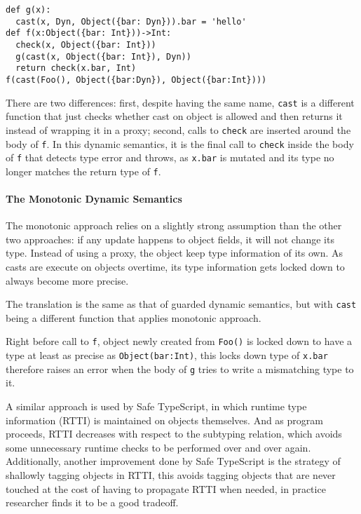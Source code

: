\begin{verbatim}
def g(x):
  cast(x, Dyn, Object({bar: Dyn})).bar = 'hello'
def f(x:Object({bar: Int}))->Int:
  check(x, Object({bar: Int}))
  g(cast(x, Object({bar: Int}), Dyn))
  return check(x.bar, Int)
f(cast(Foo(), Object({bar:Dyn}), Object({bar:Int})))
\end{verbatim}

There are two differences: first, despite having the same name, \texttt{cast} is a different
function that just checks whether cast on object is allowed and then returns it instead
of wrapping it in a proxy; second, calls to \texttt{check} are inserted around the body of \texttt{f}.
In this dynamic semantics, it is the final call to \texttt{check} inside the body of \texttt{f} that
detects type error and throws, as \texttt{x.bar} is mutated and its type no longer matches the return
type of \texttt{f}.

\paragraph{The Monotonic Dynamic Semantics}

The monotonic approach relies on a slightly strong assumption than the other two approaches:
if any update happens to object fields, it will not change its type.
Instead of using a proxy, the object keep type information of its own. As casts are execute on objects
overtime, its type information gets locked down to always become more precise.

The translation is the same as that of guarded dynamic semantics, but with \texttt{cast} being a different
function that applies monotonic approach.

Right before call to \texttt{f}, object newly created from \texttt{Foo()} is locked down to
have a type at least as precise as \texttt{Object({bar:Int})}, this locks down type of \texttt{x.bar}
therefore raises an error when the body of \texttt{g} tries to write a mismatching type to it.

A similar approach is used by Safe TypeScript, in which runtime type information (RTTI) is maintained on
objects themselves. And as program proceeds, RTTI decreases with respect to the subtyping relation,
which avoids some unnecessary runtime checks to be performed over and over again.
Additionally, another improvement done by Safe TypeScript is
the strategy of shallowly tagging objects in RTTI, this avoids tagging objects that are never touched
at the cost of having to propagate RTTI when needed, in practice researcher finds it to be a good tradeoff.

